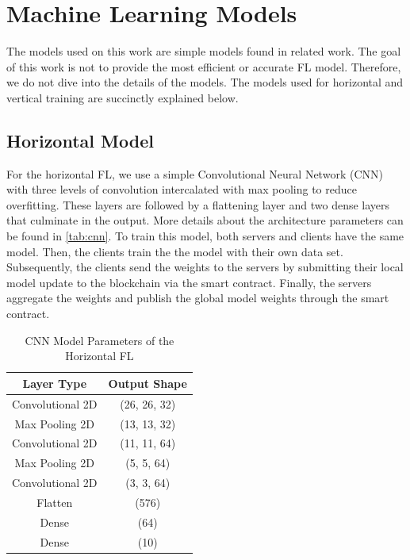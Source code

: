 \section{Machine Learning Models}\label{eval:ml_models}

The models used on this work are simple models found in related work. The goal of this work is not to provide the most efficient or accurate FL model. Therefore, we do not dive into the details of the models. The models used for horizontal and vertical training are succinctly explained below.

\subsection{Horizontal Model}

For the horizontal FL, we use a simple Convolutional Neural Network (CNN) \cite{cnn} with three levels of convolution intercalated with max pooling to reduce overfitting. These layers are followed by a flattening layer and two dense layers that culminate in the output. More details about the architecture parameters can be found in \autoref{tab:cnn}. To train this model, both servers and clients have the same model. Then, the clients train the the model with their own data set. Subsequently, the clients send the weights to the servers by submitting their local model update to the blockchain via the smart contract. Finally, the servers aggregate the weights and publish the global model weights through the smart contract.

\begin{table}[!h]
    \begin{tabular}{c|c}
        \hline \hline
        Layer Type       & Output Shape \\ \hline \hline
        Convolutional 2D & (26, 26, 32) \\ \hline
        Max Pooling 2D   & (13, 13, 32) \\ \hline
        Convolutional 2D & (11, 11, 64) \\ \hline
        Max Pooling 2D   & (5, 5, 64)   \\ \hline
        Convolutional 2D & (3, 3, 64)   \\ \hline
        Flatten          & (576)        \\ \hline
        Dense            & (64)         \\ \hline
        Dense            & (10)         \\ \hline
    \end{tabular}
    \caption{CNN Model Parameters of the Horizontal FL}
    \label{tab:cnn}
\end{table}

